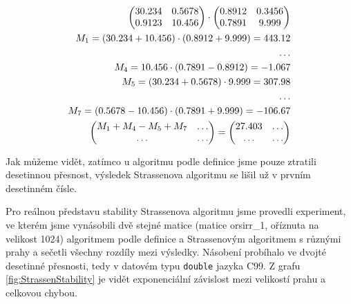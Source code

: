 \begin{align}
\begin{pmatrix}
 30.234 & 0.5678 \\
 0.9123 & 10.456
\end{pmatrix} \cdot \begin{pmatrix}
 0.8912 & 0.3456 \\
 0.7891 & 9.999
\end{pmatrix} \notag\\
M_{1} = (30.234 + 10.456) \cdot (0.8912 + 9.999) = 443.12  \notag\\
\hdots \notag\\
M_{4} = 10.456 \cdot (0.7891 - 0.8912) = -1.067 \notag\\
M_{5} = (30.234 + 0.5678) \cdot 9.999 = 307.98 \notag\\
\hdots \notag\\
M_{7} = (0.5678 - 10.456) \cdot (0.7891 + 9.999) = -106.67 \notag\\
 \begin{pmatrix}
 M_{1} + M_{4} - M_{5} + M_{7} & \hdots \\
 \hdots & \hdots
\end{pmatrix} = \begin{pmatrix}
 27.403 & \hdots \\
 \hdots & \hdots
\end{pmatrix} \notag
\end{align}


Jak můžeme vidět, zatímco u algoritmu podle definice jsme pouze ztratili desetinnou přesnost, výsledek Strassenova algoritmu se lišil už v prvním desetinném čísle. 

Pro reálnou představu stability Strassenova algoritmu jsme provedli experiment, ve kterém jsme vynásobili dvě stejné matice (matice orsirr\_1, oříznuta na velikost 1024) algoritmem podle definice a Strassenovým algoritmem s různými prahy a sečetli všechny rozdíly mezi výsledky. Násobení probíhalo ve dvojté desetinné přesnosti, tedy v datovém typu \texttt{double} jazyka C99. Z grafu \ref{fig:StrassenStability} je vidět exponenciální závislost mezi velikostí prahu a celkovou chybou.

